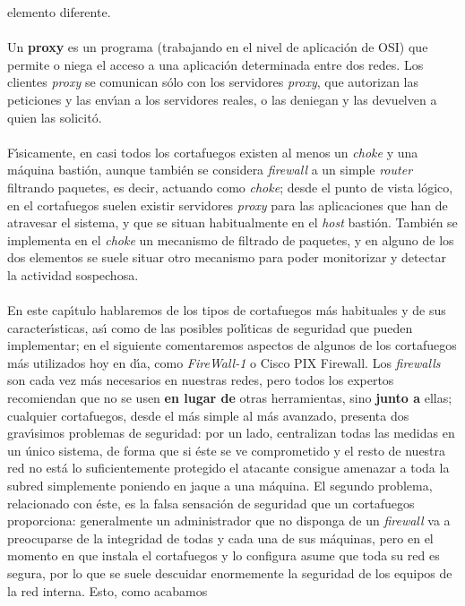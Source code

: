 elemento diferente.\\
\\Un {\bf proxy} es un programa (trabajando en el nivel de aplicaci\'on de OSI)
que permite o niega el acceso a una aplicaci\'on determinada entre dos redes. 
Los clientes {\it proxy} se comunican s\'olo con los servidores {\it proxy}, 
que autorizan las peticiones y las env\'{\i}an a los servidores reales, o las
deniegan y las devuelven a quien las solicit\'o.\\
\\F\'{\i}sicamente, en casi todos los cortafuegos existen al menos un {\it 
choke} y una m\'aquina basti\'on, aunque tambi\'en se considera {\it firewall} 
a un simple {\it router} filtrando paquetes, es decir, actuando como {\it 
choke}; desde el punto de vista l\'ogico, en el cortafuegos suelen existir 
servidores {\it proxy} para las aplicaciones que han de atravesar el sistema, y
que se situan habitualmente en el {\it host} basti\'on. Tambi\'en se implementa
en el {\it choke} un mecanismo de filtrado de paquetes, y en alguno de los
dos elementos se suele situar otro mecanismo para poder monitorizar y detectar 
la actividad sospechosa.\\
\\En este cap\'{\i}tulo hablaremos de los tipos de cortafuegos m\'as 
habituales y de sus caracter\'{\i}sticas, as\'{\i} como de las posibles 
pol\'{\i}ticas de seguridad que pueden implementar; en el siguiente 
comentaremos aspectos de algunos de los cortafuegos m\'as utilizados hoy en 
d\'{\i}a, como {\it FireWall-1} o Cisco PIX Firewall. Los {\it firewalls} son 
cada vez m\'as
necesarios en nuestras redes, pero todos los expertos recomiendan que no se usen
{\bf en lugar de} otras herramientas, sino {\bf junto a} ellas; cualquier 
cortafuegos, desde el m\'as simple al m\'as avanzado, presenta dos 
grav\'{\i}simos problemas de seguridad: por un lado, centralizan todas las 
medidas en un \'unico sistema, de forma que si \'este se ve comprometido y 
el resto de nuestra red no est\'a lo suficientemente protegido el atacante 
consigue amenazar a toda la subred simplemente poniendo en jaque a una 
m\'aquina. El segundo problema, relacionado con \'este, es la falsa sensaci\'on
de seguridad que un cortafuegos proporciona: generalmente un administrador que
no disponga de un {\it firewall} va a preocuparse de la integridad de todas y
cada una de sus m\'aquinas, pero en el momento en que instala el cortafuegos
y lo configura asume que toda su red es segura, por lo que se suele descuidar
enormemente la seguridad de los equipos de la red interna. Esto, como acabamos
